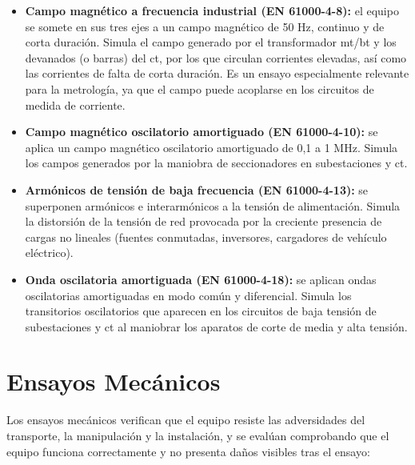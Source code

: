\begin{itemize}
    \item \textbf{Campo magnético a frecuencia industrial (EN 61000-4-8):} el equipo se somete en sus tres ejes a un campo magnético de 50 Hz, continuo y de corta duración. Simula el campo generado por el transformador \gls{mt}/\gls{bt} y los devanados (o barras) del \gls{ct}, por los que circulan corrientes elevadas, así como las corrientes de falta de corta duración. Es un ensayo especialmente relevante para la metrología, ya que el campo puede acoplarse en los circuitos de medida de corriente.
    \item \textbf{Campo magnético oscilatorio amortiguado (EN 61000-4-10):} se aplica un campo magnético oscilatorio amortiguado de 0,1 a 1 MHz. Simula los campos generados por la maniobra de seccionadores en subestaciones y \gls{ct}.
    \item \textbf{Armónicos de tensión de baja frecuencia (EN 61000-4-13):} se superponen armónicos e interarmónicos a la tensión de alimentación. Simula la distorsión de la tensión de red provocada por la creciente presencia de cargas no lineales (fuentes conmutadas, inversores, cargadores de vehículo eléctrico).
    \item \textbf{Onda oscilatoria amortiguada (EN 61000-4-18):} se aplican ondas oscilatorias amortiguadas en modo común y diferencial. Simula los transitorios oscilatorios que aparecen en los circuitos de baja tensión de subestaciones y \gls{ct} al maniobrar los aparatos de corte de media y alta tensión.
\end{itemize}

\section{Ensayos Mecánicos}
\label{sec:ensayos_mecanicos}

Los ensayos mecánicos verifican que el equipo resiste las adversidades del transporte, la manipulación y la instalación, y se evalúan comprobando que el equipo funciona correctamente y no presenta daños visibles tras el ensayo:


